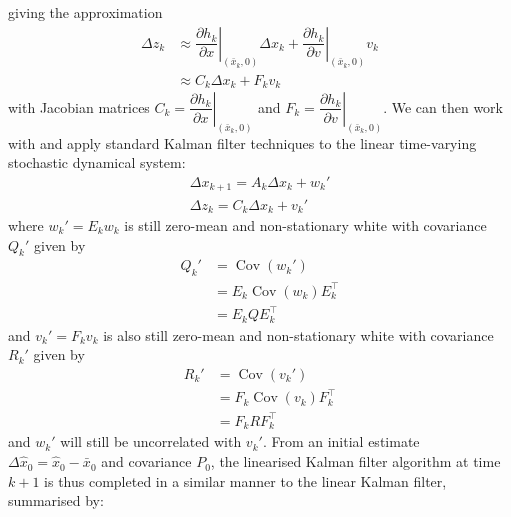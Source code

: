 \documentclass[11pt]{report} %
\begin{document}
giving the approximation
\begin{align}
\Delta z_{k} &\approx \left.\dfrac{\partial h_{k}}{\partial x}\right|_{\left(\bar{x}_{k}, 0\right)}\Delta x_{k} + \left.\dfrac{\partial h_{k}}{\partial v}\right|_{\left(\bar{x}_{k}, 0\right)}v_{k} \\
&\approx C_{k}\Delta x_{k} + F_{k}v_{k}
\end{align}
with Jacobian matrices $C_{k} = \left.\dfrac{\partial h_{k}}{\partial x}\right|_{\left(\bar{x}_{k}, 0\right)}$ and $F_{k} = \left.\dfrac{\partial h_{k}}{\partial v}\right|_{\left(\bar{x}_{k}, 0\right)}$. We can then work with and apply standard Kalman filter techniques to the linear time-varying stochastic dynamical system:
\begin{gather}
\Delta x_{k + 1} = A_{k}\Delta x_{k} + w_{k}' \\
\Delta z_{k} = C_{k}\Delta x_{k} + v_{k}'
\end{gather}
where $w_{k}' = E_{k}w_{k}$ is still zero-mean and non-stationary white with covariance $Q_{k}'$ given by
\begin{align}
Q_{k}' &= \operatorname{Cov}\left(w_{k}'\right) \\
&= E_{k}\operatorname{Cov}\left(w_{k}\right)E_{k}^{\top} \\
&= E_{k}QE_{k}^{\top}
\end{align}
and $v_{k}' = F_{k}v_{k}$ is also still zero-mean and non-stationary white with covariance $R_{k}'$ given by
\begin{align}
R_{k}' &= \operatorname{Cov}\left(v_{k}'\right) \\
&= F_{k}\operatorname{Cov}\left(v_{k}\right)F_{k}^{\top} \\
&= F_{k}RF_{k}^{\top}
\end{align}
and $w_{k}'$ will still be uncorrelated with $v_{k}'$. From an initial estimate $\Delta \hat{x}_{0} = \hat{x}_{0} - \bar{x}_{0}$ and covariance $P_{0}$, the linearised Kalman filter algorithm at time $k + 1$ is thus completed in a similar manner to the linear Kalman filter, summarised by:
\end{document}
